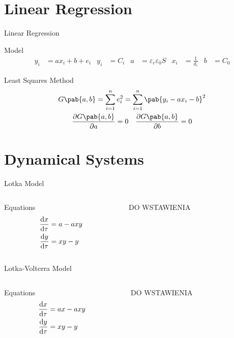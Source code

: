 \documentclass[xcolor]{beamer}
\newcommand{\inv}[1]{\frac{1}{#1}}
\begin{document}
\section{Linear Regression}
\begin{frame}{Linear Regression}
\begin{block}{Model}
\begin{align*}
y_{i} &= a x_{i} + b + e_{i} & y_{i} &= C_{i} & a &= \varepsilon_{r}\varepsilon_{0}S & x_{i} &= \inv{d_{i}} & b &= C_{0}
\end{align*}
\end{block}
\begin{block}{Least Squares Method}
\begin{gather*}
G\pab{a,b} = \sum_{i=1}^{n}e_{i}^{2} = \sum_{i=1}^{n}\pab{y_{i} - a x_{i} - b}^{2} \\
\pdv{G\pab{a,b}}{a} = 0 \quad \pdv{G\pab{a,b}}{b} = 0
\end{gather*}
\end{block}
\end{frame}

\section{Dynamical Systems}
\begin{frame}{Lotka Model}
\begin{columns}
\begin{column}{0.5\textwidth}
\begin{block}{Equations}
\begin{align*}
\odv{x}{\tau} &= a - axy \\
\odv{y}{\tau} &= xy - y
\end{align*}
\end{block}
\end{column}

\begin{column}{0.5\textwidth}
DO WSTAWIENIA
\end{column}
\end{columns}
\end{frame}

\begin{frame}{Lotka-Volterra Model}
\begin{columns}
\begin{column}{0.5\textwidth}
\begin{block}{Equations}
\begin{align*}
\odv{x}{\tau} &= ax - axy \\
\odv{y}{\tau} &= xy - y
\end{align*}
\end{block}
\end{column}

\begin{column}{0.5\textwidth}
DO WSTAWIENIA
\end{column}
\end{columns}
\end{frame}
\end{document}
